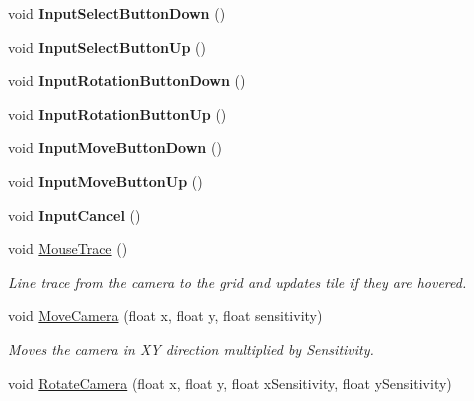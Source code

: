 \begin{DoxyCompactItemize}
void {\bfseries Input\+Select\+Button\+Down} ()
\item 
\mbox{\label{class_a_t_t___player_grid_camera_aeeb6cfbdab8803f40747796076729a07}} 
void {\bfseries Input\+Select\+Button\+Up} ()
\item 
\mbox{\label{class_a_t_t___player_grid_camera_a58b790b3154d729c93f4226e3022a306}} 
void {\bfseries Input\+Rotation\+Button\+Down} ()
\item 
\mbox{\label{class_a_t_t___player_grid_camera_aa06f0ce4ad1af5d7e48171f35f2abd8e}} 
void {\bfseries Input\+Rotation\+Button\+Up} ()
\item 
\mbox{\label{class_a_t_t___player_grid_camera_a50ec5e502ebe9337580f342106f5afc0}} 
void {\bfseries Input\+Move\+Button\+Down} ()
\item 
\mbox{\label{class_a_t_t___player_grid_camera_a89dd4e8347109bb613735dcc35b6f89d}} 
void {\bfseries Input\+Move\+Button\+Up} ()
\item 
\mbox{\label{class_a_t_t___player_grid_camera_a095c6cdbf81d0e428728afe0be13a9fd}} 
void {\bfseries Input\+Cancel} ()
\item 
void \mbox{\hyperlink{class_a_t_t___player_grid_camera_adff10752fbd388a46227a42a2140d6d0}{Mouse\+Trace}} ()
\begin{DoxyCompactList}\small\item\em Line trace from the camera to the grid and updates tile if they are hovered. \end{DoxyCompactList}\item 
void \mbox{\hyperlink{class_a_t_t___player_grid_camera_a1e45820a848051156885e4275e013a20}{Move\+Camera}} (float x, float y, float sensitivity)
\begin{DoxyCompactList}\small\item\em Moves the camera in XY direction multiplied by Sensitivity. \end{DoxyCompactList}\item 
void \mbox{\hyperlink{class_a_t_t___player_grid_camera_a912c3c1f4bb7b5351822d3d46e0e7396}{Rotate\+Camera}} (float x, float y, float x\+Sensitivity, float y\+Sensitivity)

\end{DoxyCompactItemize}
